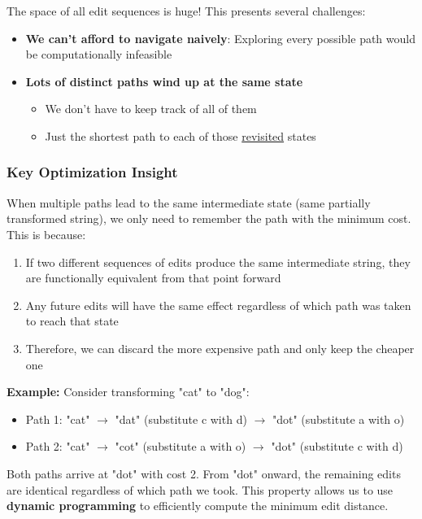 \documentclass[11pt,a4paper]{article}
\theoremstyle{definition}
\theoremstyle{plain}
\theoremstyle{remark}
\begin{document}
The space of all edit sequences is huge! This presents several challenges:

\begin{itemize}
    \item \textbf{We can't afford to navigate naively}: Exploring every possible path would be computationally infeasible
    
    \item \textbf{Lots of distinct paths wind up at the same state}
    \begin{itemize}
        \item We don't have to keep track of all of them
        \item Just the shortest path to each of those \underline{revisited} states
    \end{itemize}
\end{itemize}

\subsubsection{Key Optimization Insight}

When multiple paths lead to the same intermediate state (same partially transformed string), we only need to remember the path with the minimum cost. This is because:

\begin{enumerate}
    \item If two different sequences of edits produce the same intermediate string, they are functionally equivalent from that point forward
    \item Any future edits will have the same effect regardless of which path was taken to reach that state
    \item Therefore, we can discard the more expensive path and only keep the cheaper one
\end{enumerate}

\textbf{Example:} Consider transforming "cat" to "dog":
\begin{itemize}
    \item Path 1: "cat" $\rightarrow$ "dat" (substitute c with d) $\rightarrow$ "dot" (substitute a with o)
    \item Path 2: "cat" $\rightarrow$ "cot" (substitute a with o) $\rightarrow$ "dot" (substitute c with d)
\end{itemize}

Both paths arrive at "dot" with cost 2. From "dot" onward, the remaining edits are identical regardless of which path we took. This property allows us to use \textbf{dynamic programming} to efficiently compute the minimum edit distance.
\end{document}
